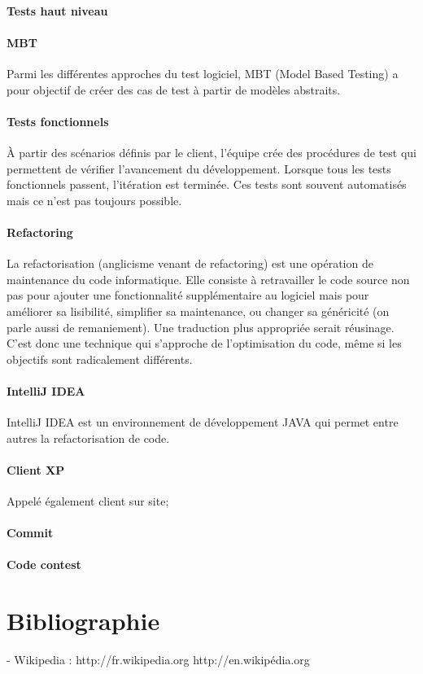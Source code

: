 \paragraph{Tests haut niveau}
\paragraph{MBT}
Parmi les différentes approches du test logiciel, MBT (Model Based Testing) a pour objectif de créer des cas de test à partir de modèles abstraits.
\paragraph{Tests fonctionnels}
À partir des scénarios définis par le client, l'équipe crée des procédures de test qui permettent de vérifier l'avancement du développement. Lorsque tous les tests fonctionnels passent, l'itération est terminée. Ces tests sont souvent automatisés mais ce n'est pas toujours possible.
\paragraph{Refactoring}
La refactorisation (anglicisme venant de refactoring) est une opération de maintenance du code informatique. Elle consiste à retravailler le code source non pas pour ajouter une fonctionnalité supplémentaire au logiciel mais pour améliorer sa lisibilité, simplifier sa maintenance, ou changer sa généricité (on parle aussi de remaniement). Une traduction plus appropriée serait réusinage. C'est donc une technique qui s'approche de l'optimisation du code, même si les objectifs sont radicalement différents. 
\paragraph{IntelliJ IDEA}
IntelliJ IDEA est un environnement de développement JAVA qui permet entre autres la refactorisation de code.
\paragraph{Client XP}
Appelé également client sur site; 
\paragraph{Commit}
\paragraph{Code contest}
\section{Bibliographie}
- Wikipedia : 
http://fr.wikipedia.org
http://en.wikipédia.org
